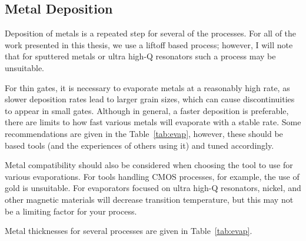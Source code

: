\subsection{Metal Deposition}
\label{sec:metaldep}
Deposition of metals is a repeated step for several of the processes. For all of the work presented in this thesis, we use a
liftoff based process; however, I will note that for sputtered metals or ultra high-Q resonators such a process may be unsuitable.

For thin gates, it is necessary to evaporate metals at a reasonably high rate, as slower deposition rates lead to larger
grain sizes, which can cause discontinuities to appear in small gates. Although in general, a faster deposition is preferable,
there are limits to how fast various metals will evaporate with a stable rate. Some recommendations are given in the Table~\ref{tab:evap}, however,
these should be based tools (and the experiences of others using it) and tuned accordingly.

Metal compatibility should also be considered when choosing the tool to use for various evaporations. For tools handling CMOS processes,
for example, the use of gold is unsuitable. For evaporators focused on ultra high-Q resonators, nickel, and other magnetic materials
will decrease transition temperature, but this may not be a limiting factor for your process.

Metal thicknesses for several processes are given in Table~\ref{tab:evap}.

